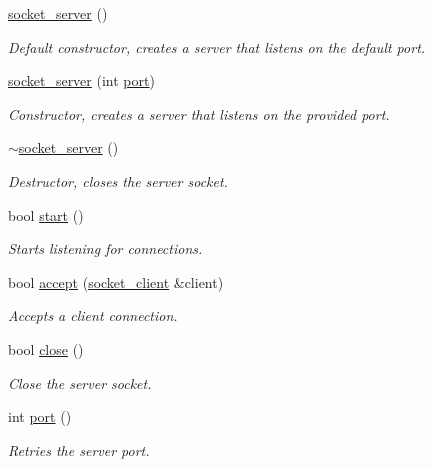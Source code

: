\begin{DoxyCompactItemize}
\item 
\hyperlink{classcpen333_1_1process_1_1posix_1_1socket__server_a2880c0745a27f52a545619f48f7e06bd}{socket\+\_\+server} ()
\begin{DoxyCompactList}\small\item\em Default constructor, creates a server that listens on the default port. \end{DoxyCompactList}\item 
\hyperlink{classcpen333_1_1process_1_1posix_1_1socket__server_a105715f9f86df458e790db89135a7aac}{socket\+\_\+server} (int \hyperlink{classcpen333_1_1process_1_1posix_1_1socket__server_a5962af3110c19660b29f154f867e87e2}{port})
\begin{DoxyCompactList}\small\item\em Constructor, creates a server that listens on the provided port. \end{DoxyCompactList}\item 
\hyperlink{classcpen333_1_1process_1_1posix_1_1socket__server_a2d07def5c83de193cc2f19c51be31c17}{$\sim$socket\+\_\+server} ()
\begin{DoxyCompactList}\small\item\em Destructor, closes the server socket. \end{DoxyCompactList}\item 
bool \hyperlink{classcpen333_1_1process_1_1posix_1_1socket__server_a0d02be64318ad8d7686633f1bdddc677}{start} ()
\begin{DoxyCompactList}\small\item\em Starts listening for connections. \end{DoxyCompactList}\item 
bool \hyperlink{classcpen333_1_1process_1_1posix_1_1socket__server_aeab0f2bae871e61dda339bc19279eb7c}{accept} (\hyperlink{classcpen333_1_1process_1_1posix_1_1socket__client}{socket\+\_\+client} \&client)
\begin{DoxyCompactList}\small\item\em Accepts a client connection. \end{DoxyCompactList}\item 
bool \hyperlink{classcpen333_1_1process_1_1posix_1_1socket__server_a306aea15eb1c856f269b1c3727fbfa17}{close} ()
\begin{DoxyCompactList}\small\item\em Close the server socket. \end{DoxyCompactList}\item 
int \hyperlink{classcpen333_1_1process_1_1posix_1_1socket__server_a5962af3110c19660b29f154f867e87e2}{port} ()
\begin{DoxyCompactList}\small\item\em Retries the server port. \end{DoxyCompactList}\end{DoxyCompactItemize}


